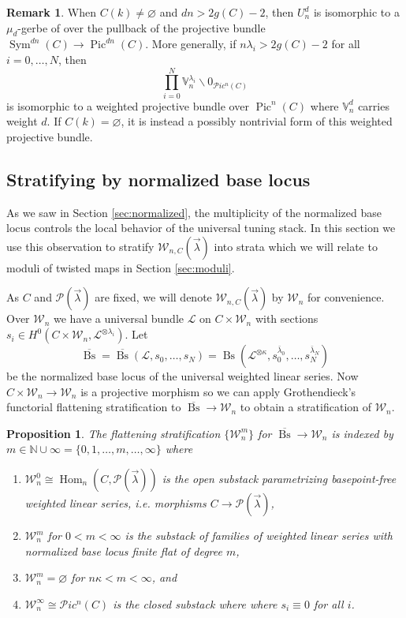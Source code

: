 \documentclass[a4paper,12pt]{amsart}
\newtheorem{prop}[thm]{Proposition}
\theoremstyle{definition}
\newtheorem{rmk}[thm]{Remark}
\newcommand{\bV}{\mathbb{V}}
\newcommand{\cL}{\mathcal{L}}
\newcommand{\cW}{\mathcal{W}}
\DeclareMathOperator{\Bs}{Bs}
\newcommand{\Pcv}{\mathcal{P}(\vec{\lambda})}
\newcommand{\lambdavec}{{\vec{\lambda}}}
\newcommand{\N}{\mathbb{N}}
\DeclareMathOperator{\Pic}{Pic}
\DeclareMathOperator{\Sym}{Sym}
\DeclareMathOperator{\Hom}{Hom}
\newcommand{\Ppic}{\mathcal{P}ic}
\renewcommand{\setminus}{\smallsetminus}
\begin{document}
	
	\begin{rmk}\label{rem:rr:gerbe}
		When $C(k) \neq \varnothing$ and $dn > 2g(C) - 2$, then $U^d_n$ is isomorphic to a $\mu_d$-gerbe of over the pullback of the projective bundle $\Sym^{dn}(C) \to \Pic^{dn}(C)$. More generally, if $n\lambda_i > 2g(C) - 2$ for all $i = 0, \ldots, N$, then
		$$
		\prod_{i = 0}^N \bV^{\lambda_i}_n \setminus 0_{\Ppic^n(C)}
		$$
		is isomorphic to a weighted projective bundle over $\Pic^n(C)$ where $\bV^d_n$ carries weight $d$. If $C(k) = \varnothing$, it is instead a possibly nontrivial form of this weighted projective bundle. 
	\end{rmk}
	
	\subsection{Stratifying by normalized base locus} 
	
	As we saw in Section \ref{sec:normalized}, the multiplicity of the normalized base locus controls the local behavior of the universal tuning stack. In this section we use this observation to stratify $\cW_{n,C}(\lambdavec)$ into strata which we will relate to moduli of twisted maps in Section \ref{sec:moduli}.
	
	As $C$ and $\Pcv$ are fixed, we will denote $\cW_{n,C}(\lambdavec)$ by $\cW_n$ for convenience. Over $\cW_n$ we have a universal bundle $\cL$ on $C \times \cW_n$ with sections $s_i \in H^0(C \times \cW_n, \cL^{\otimes \lambda_i})$. Let
	$$
	\overline{\Bs} = \overline{\Bs}(\cL, s_0, \ldots, s_N) = \Bs(\cL^{\otimes \kappa}, s_0^{\bar{\lambda}_0}, \ldots, s_N^{\bar{\lambda}_N})
	$$
	be the normalized base locus of the universal weighted linear series. Now $C \times \cW_n \to \cW_n$ is a projective morphism so we can apply Grothendieck's functorial flattening stratification to $\overline{\Bs} \to \cW_n$ to obtain a stratification of $\cW_n$. 
	
	
	
	\begin{prop}\label{prop:flattening} The flattening stratification $\{\cW_n^m\}$ for $\overline{\Bs} \to \cW_n$ is indexed by $m \in \N \cup \infty = \{0, 1, \ldots, m, \ldots, \infty\}$ where
		\begin{enumerate}
			\item $\cW^0_n \cong \Hom_n(C, \Pcv)$ is the open substack parametrizing basepoint-free weighted linear series, i.e. morphisms $C \to \Pcv$, 
			\item $\cW^m_n$ for $0 < m < \infty$ is the substack of families of weighted linear series with normalized base locus finite flat of degree $m$, 
			\item $\cW^m_n = \varnothing$ for $n\kappa < m < \infty$, and
			\item $\cW^\infty_n \cong \Ppic^n(C)$ is the closed substack where where $s_i \equiv 0$ for all $i$. 
		\end{enumerate}
		
	\end{prop}  
	
\end{document}
